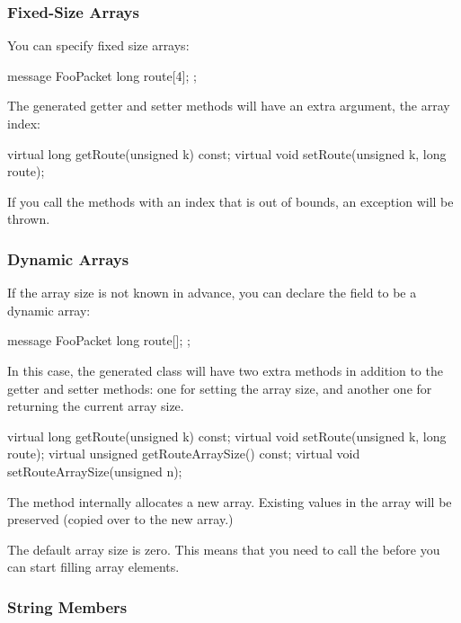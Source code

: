 \subsubsection{Fixed-Size Arrays}

You can specify fixed size arrays:

\begin{msg}
message FooPacket
{
    long route[4];
};
\end{msg}

The generated getter and setter methods will have an extra  argument,
the array index:

\begin{cpp}
virtual long getRoute(unsigned k) const;
virtual void setRoute(unsigned k, long route);
\end{cpp}

If you call the methods with an index that is out of bounds, an exception
will be thrown.


\subsubsection{Dynamic Arrays}

If the array size is not known in advance, you can declare the field
to be a dynamic array:

\begin{msg}
message FooPacket
{
    long route[];
};
\end{msg}

In this case, the generated class will have two extra methods in addition
to the getter and setter methods: one for setting the array size, and another
one for returning the current array size.

\begin{cpp}
virtual long getRoute(unsigned k) const;
virtual void setRoute(unsigned k, long route);
virtual unsigned getRouteArraySize() const;
virtual void setRouteArraySize(unsigned n);
\end{cpp}

The  method internally allocates a new array. Existing
values in the array will be preserved (copied over to the new array.)

The default array size is zero. This means that you need to call the
 before you can start filling array elements.


\subsubsection{String Members}

